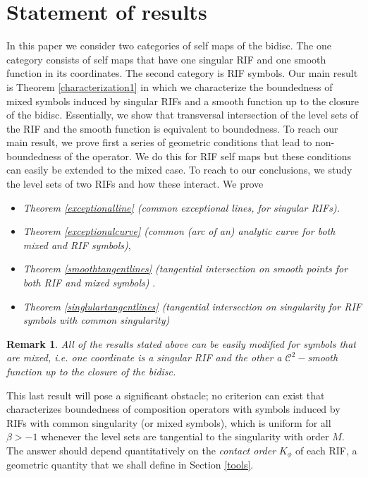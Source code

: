 \documentclass[12pt]{amsart}
\newtheorem{remark}[theorem]{Remark}
\numberwithin{equation}{section}
\begin{document}
\section{Statement of results}\label{results}  
In this paper we consider two categories of self maps of the bidisc. The one category consists of self maps that have one singular RIF and one smooth function in its coordinates. The second category is RIF symbols. Our main result is
Theorem \ref{characterization1} in which we characterize the boundedness of mixed symbols induced by singular RIFs and a smooth function up to the closure of the bidisc. Essentially, we show that transversal intersection of the level sets of the RIF and the smooth function is equivalent to boundedness. To reach  our main result, we prove first a series of geometric conditions that lead to non-boundedness of the operator. We do this for RIF self maps but these conditions can easily be extended to the mixed case. To reach to our conclusions, we study the level sets of two RIFs and how these interact. We prove
\begin{itemize}
\item \textit{Theorem \ref{exceptionalline} (common exceptional lines, for singular RIFs).}
\item \textit{Theorem \ref{exceptionalcurve} (common (arc of an) analytic curve for both mixed and RIF symbols)}, 
\item \textit{Theorem \ref{smoothtangentlines} (tangential intersection on smooth points for both RIF and mixed symbols) }.
\item \textit{Theorem \ref{singlulartangentlines} (tangential intersection on singularity for RIF symbols with common singularity)} 
\end{itemize}
\begin{remark} All of the results stated above can be easily modified for symbols that are mixed, i.e. one coordinate is a singular RIF and the other a $\mathcal{C}^2-$smooth function up to the closure of the bidisc.
\end{remark}
This last result will pose a significant obstacle; no criterion can exist that characterizes boundedness of composition operators with symbols induced by RIFs with common singularity (or mixed symbols), which is uniform for all $\beta>-1$ whenever the level sets are tangential to the singularity with order $M.$ The answer should depend quantitatively on the \textit{contact order} $K_{\phi}$ of each RIF, a geometric quantity that we shall define in Section \ref{tools}.
\end{document}

